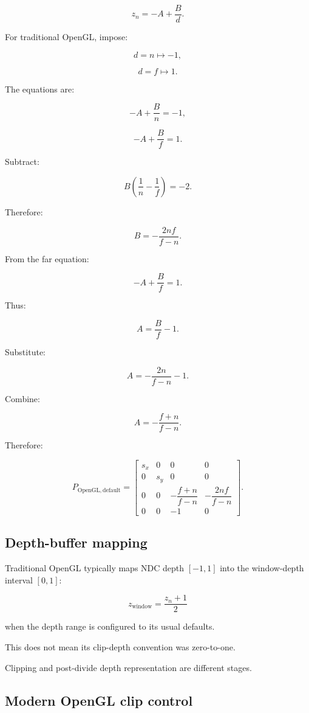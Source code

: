 \[
 z_n=-A+\frac Bd.
\]

For traditional OpenGL, impose:

\[
 d=n\mapsto-1,
\]

\[
 d=f\mapsto1.
\]

The equations are:

\[
 -A+\frac Bn=-1,
\]

\[
 -A+\frac Bf=1.
\]

Subtract:

\[
 B\left(\frac1n-\frac1f\right)=-2.
\]

Therefore:

\[
 B=-\frac{2nf}{f-n}.
\]

From the far equation:

\[
 -A+\frac Bf=1.
\]

Thus:

\[
 A=\frac Bf-1.
\]

Substitute:

\[
 A=-\frac{2n}{f-n}-1.
\]

Combine:

\[
 \boxed{ A=-\frac{f+n}{f-n} }.
\]

Therefore:

\[
 \boxed{ P_{\mathrm{OpenGL,default}}= \begin{bmatrix} s_x&0&0&0\\ 0&s_y&0&0\\ 0&0&-\dfrac{f+n}{f-n}&-\dfrac{2nf}{f-n}\\ 0&0&-1&0 \end{bmatrix} }.
\]

\subsection{Depth-buffer mapping}\label{02-foundations-ii-ch033-depth-buffer-mapping}

Traditional OpenGL typically maps NDC depth \([-1,1]\) into the window-depth interval \([0,1]\):

\[
 \boxed{ z_{\mathrm{window}}=\frac{z_n+1}{2} }
\]

when the depth range is configured to its usual defaults.

This does not mean its clip-depth convention was zero-to-one.

Clipping and post-divide depth representation are different stages.

\subsection{Modern OpenGL clip control}\label{02-foundations-ii-ch033-modern-opengl-clip-control}

